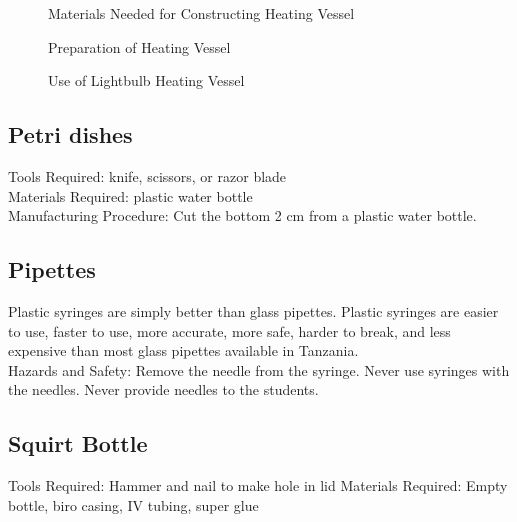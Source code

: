 \begin{figure}[h]
\begin{center}
\def\svgwidth{170pt}

\caption{Materials Needed for Constructing Heating Vessel}
\label{fig:heating vessel materials}
\end{center}
\end{figure}

\begin{figure}[h]
\begin{center}
\def\svgwidth{180pt}

\caption{Preparation of Heating Vessel}
\label{fig:heating vessel preparation}
\end{center}
\end{figure}

\begin{figure}[h!]
\begin{center}
\def\svgwidth{90pt}

\caption{Use of Lightbulb Heating Vessel}
\label{fig:heating vessel use}
\end{center}
\end{figure}

\subsection*{Petri dishes}
Tools Required: knife, scissors, or razor blade\\
Materials Required: plastic water bottle\\
Manufacturing Procedure: Cut the bottom 2 cm from a plastic water bottle.

\subsection*{Pipettes}
Plastic syringes are simply better than glass pipettes. Plastic syringes are easier to use, faster to use, more accurate, more safe, harder to break, and less expensive than most glass pipettes available in Tanzania.\\
Hazards and Safety: Remove the needle from the syringe. Never use syringes with the needles. Never provide needles to the students.

\subsection*{Squirt Bottle}
Tools Required: Hammer and nail to make hole in lid
Materials Required: Empty bottle, biro casing, IV tubing, super glue

